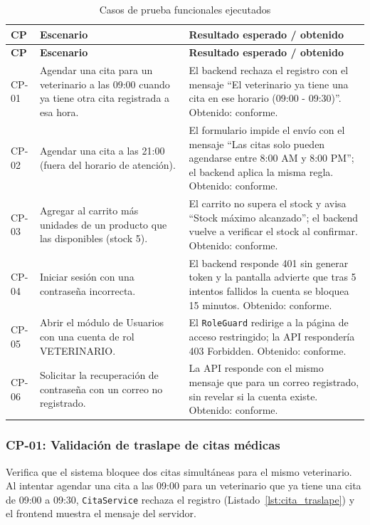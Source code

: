 \documentclass[11pt,a4paper]{report}
\begin{document}
\begin{longtable}{@{}p{1.3cm} p{6.85cm} p{6.85cm}@{}}
\caption{Casos de prueba funcionales ejecutados}\label{tab:pruebas}\\
\toprule
\textbf{CP} & \textbf{Escenario} & \textbf{Resultado esperado / obtenido} \\
\midrule
\endfirsthead
\toprule
\textbf{CP} & \textbf{Escenario} & \textbf{Resultado esperado / obtenido} \\
\midrule
\endhead
\bottomrule
\endfoot
CP-01 & Agendar una cita para un veterinario a las 09:00 cuando ya tiene otra cita registrada a esa hora. & El backend rechaza el registro con el mensaje ``El veterinario ya tiene una cita en ese horario (09:00 - 09:30)''. Obtenido: conforme. \\
\addlinespace
CP-02 & Agendar una cita a las 21:00 (fuera del horario de atención). & El formulario impide el envío con el mensaje ``Las citas solo pueden agendarse entre 8:00 AM y 8:00 PM''; el backend aplica la misma regla. Obtenido: conforme. \\
\addlinespace
CP-03 & Agregar al carrito más unidades de un producto que las disponibles (stock 5). & El carrito no supera el stock y avisa ``Stock máximo alcanzado''; el backend vuelve a verificar el stock al confirmar. Obtenido: conforme. \\
\addlinespace
CP-04 & Iniciar sesión con una contraseña incorrecta. & El backend responde 401 sin generar token y la pantalla advierte que tras 5 intentos fallidos la cuenta se bloquea 15 minutos. Obtenido: conforme. \\
\addlinespace
CP-05 & Abrir el módulo de Usuarios con una cuenta de rol VETERINARIO. & El \texttt{RoleGuard} redirige a la página de acceso restringido; la API respondería 403 Forbidden. Obtenido: conforme. \\
\addlinespace
CP-06 & Solicitar la recuperación de contraseña con un correo no registrado. & La API responde con el mismo mensaje que para un correo registrado, sin revelar si la cuenta existe. Obtenido: conforme. \\
\end{longtable}

\subsubsection{CP-01: Validación de traslape de citas médicas}
Verifica que el sistema bloquee dos citas simultáneas para el mismo veterinario. Al intentar agendar una cita a las 09:00 para un veterinario que ya tiene una cita de 09:00 a 09:30, \texttt{CitaService} rechaza el registro (Listado~\ref{lst:cita_traslape}) y el frontend muestra el mensaje del servidor.
\end{document}

